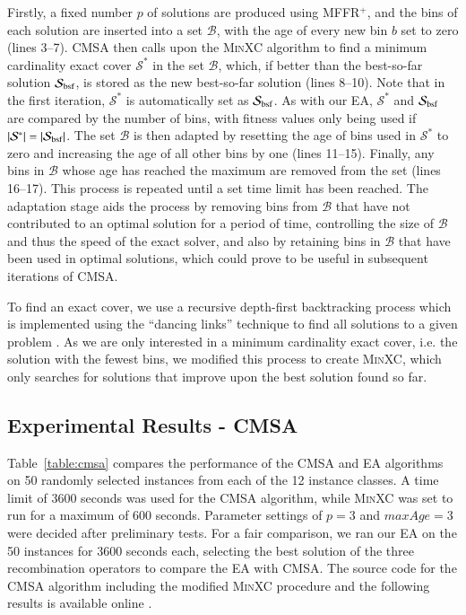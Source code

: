 \documentclass[authoryear]{elsarticle}
\begin{document}
Firstly, a fixed number $p$ of solutions are produced using MFFR$^+$, and the bins of each solution are inserted into a set $\mathcal{B}$, with the age of every new bin $b$ set to zero (lines 3--7). CMSA then calls upon the \textsc{MinXC} algorithm to find a minimum cardinality exact cover $\mathcal{S}^*$ in the set $\mathcal{B}$, which, if better than the best-so-far solution $\mathcal{S}_{\textup{bsf}}$, is stored as the new best-so-far solution (lines 8--10). Note that in the first iteration, $\mathcal{S}^*$ is automatically set as $\mathcal{S}_{\textup{bsf}}$. As with our EA, $\mathcal{S}^*$ and $\mathcal{S}_{\textup{bsf}}$ are compared by the number of bins, with fitness values only being used if $|\mathcal{S}^*| = |\mathcal{S}_{\textup{bsf}}|$. The set $\mathcal{B}$ is then adapted by resetting the age of bins used in $\mathcal{S}^*$ to zero and increasing the age of all other bins by one (lines 11--15). Finally, any bins in $\mathcal{B}$ whose age has reached the maximum are removed from the set (lines 16--17). This process is repeated until a set time limit has been reached. The adaptation stage aids the process by removing bins from $\mathcal{B}$ that have not contributed to an optimal solution for a period of time, controlling the size of $\mathcal{B}$ and thus the speed of the exact solver, and also by retaining bins in $\mathcal{B}$ that have been used in optimal solutions, which could prove to be useful in subsequent iterations of CMSA.

To find an exact cover, we use a recursive depth-first backtracking process which is implemented using the ``dancing links'' technique to find all solutions to a given problem \citep{knuth2000}. As we are only interested in a minimum cardinality exact cover, i.e. the solution with the fewest bins, we modified this process to create \textsc{MinXC}, which only searches for solutions that improve upon the best solution found so far.

\subsection{Experimental Results - CMSA}
\label{sub:expcmsa}
\noindent Table~\ref{table:cmsa} compares the performance of the CMSA and EA algorithms on 50 randomly selected instances from each of the 12 instance classes. A time limit of 3600 seconds was used for the CMSA algorithm, while \textsc{MinXC} was set to run for a maximum of 600 seconds. Parameter settings of $p = 3$ and $maxAge = 3$ were decided after preliminary tests. For a fair comparison, we ran our EA on the 50 instances for 3600 seconds each, selecting the best solution of the three recombination operators to compare the EA with CMSA. The source code for the CMSA algorithm including the modified \textsc{MinXC} procedure and the following results is available online \citep{hawa2019cmsa}.
\end{document}
